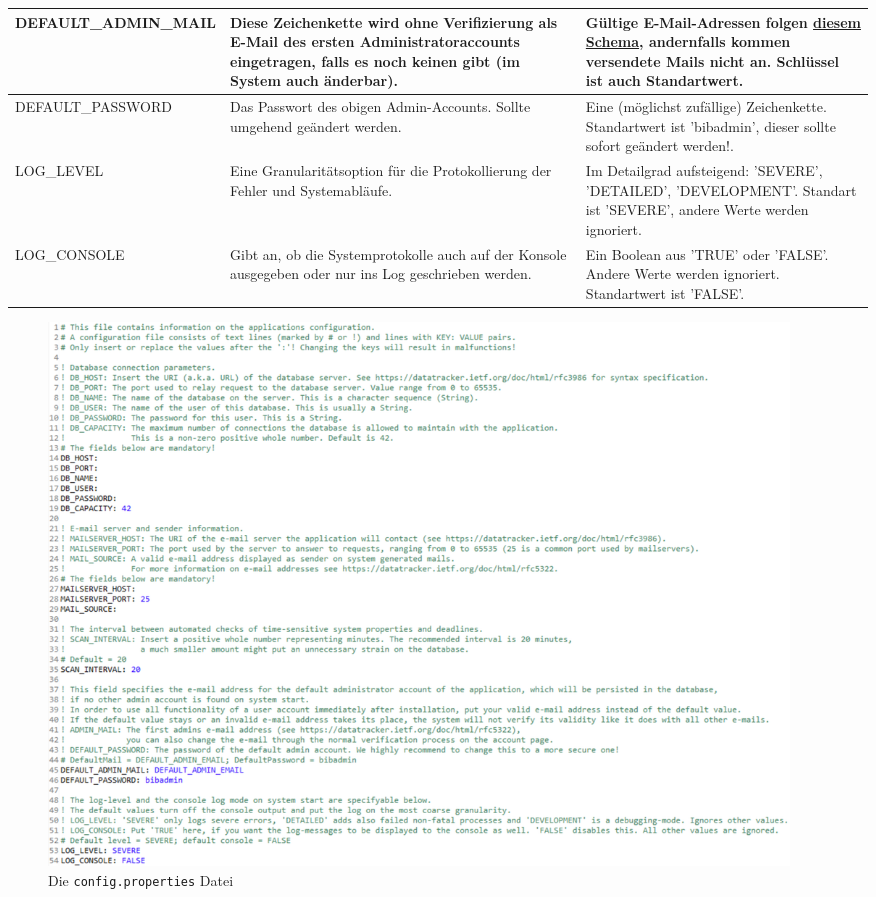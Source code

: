 \documentclass{article}
\begin{document}
\begin{center}
\begin{table}[H]
\begin{tabular} {| m{4cm} | m{6cm} | m{5cm} |}
\hline
DEFAULT\_ADMIN\_MAIL & Diese Zeichenkette wird ohne Verifizierung als E-Mail des ersten Administratoraccounts eingetragen, falls es noch keinen gibt (im System auch änderbar).  & Gültige E-Mail-Adressen folgen \hyperlink{https://datatracker.ietf.org/doc/html/rfc5322}{diesem Schema}, andernfalls kommen versendete Mails nicht an. Schlüssel ist auch Standartwert.\\
\hline
DEFAULT\_PASSWORD & Das Passwort des obigen Admin-Accounts. Sollte umgehend geändert werden. & Eine (möglichst zufällige) Zeichenkette. Standartwert ist 'bibadmin', dieser sollte sofort geändert werden!. \\
\hline
LOG\_LEVEL & Eine Granularitätsoption für die Protokollierung der Fehler und Systemabläufe. & Im Detailgrad aufsteigend: 'SEVERE', 'DETAILED', 'DEVELOPMENT'. Standart ist 'SEVERE', andere Werte werden ignoriert. \\
\hline
LOG\_CONSOLE & Gibt an, ob die Systemprotokolle auch auf der Konsole ausgegeben oder nur ins Log geschrieben werden. & Ein Boolean aus 'TRUE' oder 'FALSE'. Andere Werte werden ignoriert. Standartwert ist 'FALSE'. \\
\hline
\end{tabular}
\end{table}
\end{center}

\begin{figure}
\hypertarget{configFoto}{}
\centering
\includegraphics[angle = 270, width = 53em]{configProperties}
\caption{Die \texttt{config.properties} Datei}
\end{figure}
\restoregeometry
\end{document}
